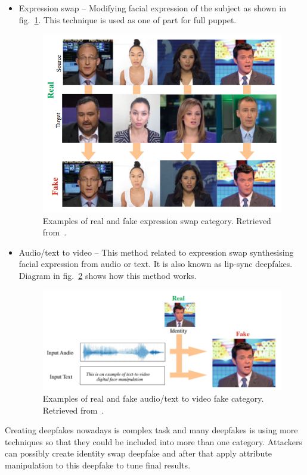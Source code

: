 \begin{itemize}
    \item Expression swap – Modifying facial expression of the subject as shown in fig.~\ref{fig:expression_swap}. This technique is used as one of part for full puppet.
    \begin{figure}[H]
        \centering
        \includegraphics[width=.52\linewidth]{other-fig/expression_swap.png}
        \caption{Examples of real and fake expression swap category. Retrieved from~\cite{IntroductionToDigitalFaceManipulation}.}
        \label{fig:expression_swap}
    \end{figure}

    \item Audio/text to video – This method related to expression swap synthesising facial expression from audio or text. It is also known as lip-sync deepfakes. Diagram in fig.~\ref{fig:audio_to_video} shows how this method works.
    \begin{figure}[H]
        \centering
        \includegraphics[width=.6\linewidth]{other-fig/audio_to_video.png}
        \caption{Examples of real and fake audio/text to video fake category. Retrieved from~\cite{IntroductionToDigitalFaceManipulation}.}
        \label{fig:audio_to_video}
    \end{figure}
\end{itemize}

Creating deepfakes nowadays is complex task and many deepfakes is using more techniques so that they could be included into more than one category. Attackers can possibly create identity swap deepfake and after that apply attribute manipulation to this deepfake to tune final results.

